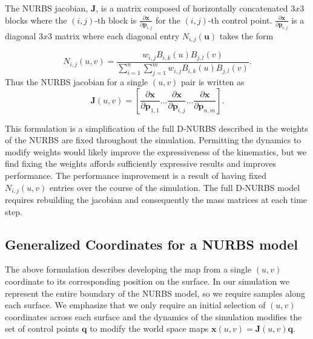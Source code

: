 The NURBS jacobian, $\mathbf{J}$, is a matrix composed of horizontally concatenated $3x3$ blocks where the $(i,j)$-th block is $\frac{\partial \mathbf{x}}{\partial \mathbf{p}_{i,j}}$ for the $(i,j)$-th control point. $\frac{\partial \mathbf{x}}{\partial \mathbf{p}_{i,j}}$ is a diagonal $3x3$ matrix where each diagonal entry $N_{i,j}(\mathbf{u})$ takes the form

\begin{equation}
\label{eqn:jacobian_diagonal}
    N_{i,j}(u,v)
    = \frac{w_{i,j} B_{i,k}(u)B_{j,l}(v)}{\sum_{i=1}^{n}\sum_{j=1}^{m} w_{i,j} B_{i,k}(u)B_{j,l}(v)}
    \text{.}
\end{equation}
Thus the NURBS jacobian for a single $(u,v)$ pair is written as
\begin{equation}
\label{eqn:uv_jacobian}
    \mathbf{J}(u,v) =
    \left[ \frac{\partial \mathbf{x}}{\partial \mathbf{p}_{1,1}} \dots
           \frac{\partial \mathbf{x}}{\partial \mathbf{p}_{i,j}} \dots 
           \frac{\partial \mathbf{x}}{\partial \mathbf{p}_{n,m}}
    \right]
    \text{.}
\end{equation}

This formulation is a simplification of the full D-NURBS described in \cite{10.1145/176579.176580} the weights of the NURBS are fixed throughout the simulation. Permitting the dynamics to modify weights would likely improve the expressiveness of the kinematics, but we find fixing the weights affords sufficiently expressive results and improves performance. The performance improvement is a result of having fixed $N_{i,j}(u,v)$ entries over the course of the simulation. The full D-NURBS model requires rebuilding the jacobian and consequently the mass matrices at each time step. 

\subsection{Generalized Coordinates for a NURBS model}
The above formulation describes developing the map from a single $(u,v)$ coordinate to its corresponding position on the surface. In our simulation we represent the entire boundary of the NURBS model, so we require samples along each surface. We emphasize that we only require an initial selection of $(u,v)$ coordinates across each surface and the dynamics of the simulation modifies the set of control points $\mathbf{q}$ to modify the world space maps $\mathbf{x}(u,v)=\mathbf{J}(u,v)\mathbf{q}$.

